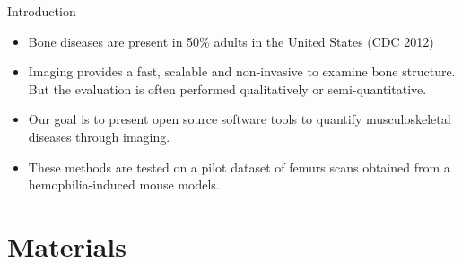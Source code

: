 \documentclass[10pt,aspectratio=169]{beamer}
\begin{document}
\begin{frame}[fragile]{Introduction}
\begin{itemize} \itemsep1em
\item Bone diseases are present in 50\% adults in the United States (CDC 2012)

\item Imaging provides a fast, scalable and non-invasive to examine bone structure. But the evaluation is often performed qualitatively or semi-quantitative.

\item Our goal is to present open source software tools to quantify musculoskeletal diseases through imaging.

\item These methods are tested on a pilot dataset of femurs scans obtained from a hemophilia-induced mouse models.
\end{itemize}

\end{frame}

\section{Materials}
\end{document}
